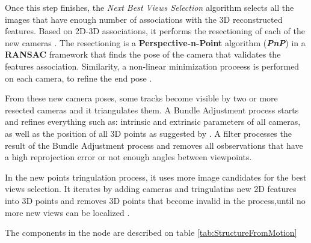 \documentclass[12pt]{report}
\begin{document}
Once this step finishes, the \textit{Next Best Views Selection} algorithm selects all the images that have enough number of associations with the 3D reconstructed features.
Based on 2D-3D associations, it performs the resectioning of each of the new cameras \citep*{Lepetit2008EPnPAA}. The resectioning is a \textbf{Perspective-n-Point} algorithm (\textbf{\textit{PnP}}) in a
\textbf{RANSAC} framework that finds the pose of the camera that validates the features association. Similarity, a non-linear minimization proceess is performed on each camera, to refine the end pose \citep*{Nister2004}.

From these new camera poses, some tracks become visible by two or more resected cameras and it triangulates them. A Bundle Adjustment process starts and refines everything such as:
intrinsic and extrinsic parameters of all cameras, as well as the position of all 3D points as suggested by \citet*{Shah2014}. A filter processes the result of the Bundle Adjustment process and removes all osbservations that have a high reprojection error or not enough angles between viewpoints.

In the new points tringulation process, it uses more image candidates for the best views selection. It iterates by adding cameras and tringulatins new 2D features into 3D points and removes 3D points that become invalid in the process,until no more new views can be localized \citep*{Shah2014}.

The components in the node are described on table \ref{tab:StructureFromMotion}
\end{document}
